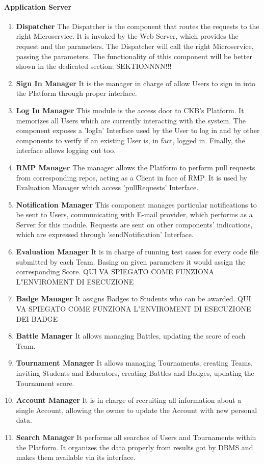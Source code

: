 \paragraph{Application Server}
\begin{enumerate}
    \item \textbf{Dispatcher} The Dispatcher is the component that routes the requests to the right Microservice. It is invoked by the Web Server, which provides the request and the parameters. The Dispatcher will call the right Microservice, passing the parameters. The functionality of tthis component will be better shown in the dedicated section: SEKTIONNNN!!!
    \item \textbf{Sign In Manager} It is the manager in charge of allow Users to sign in into the Platform through proper interface.
    \item \textbf{Log In Manager} This module is the access door to CKB's Platform. It memorizes all Users which are currently interacting with the system. The component exposes a 'logIn' Interface used by the User to log in 
    and by other components to verify if an existing User is, in fact, logged in. Finally, the interface allows logging out too.
    \item \textbf{RMP Manager} The manager allows the Platform to perform pull requests from corresponding repos, acting as a Client in face of RMP. It is used by Evaluation Manager which access 'pullRequests' Interface.
    \item \textbf{Notification Manager} This component manages particular notifications to be sent to Users, communicating with E-mail provider, which performs as a Server for this module. Requests are sent on other 
    components' indications, which are expressed through 'sendNotification' Interface.
    \item \textbf{Evaluation Manager} It is in charge of running test cases for every code file submitted by each Team. Basing on given parameters it would assign the corresponding Score.
    QUI VA SPIEGATO COME FUNZIONA L"ENVIROMENT DI ESECUZIONE
    \item \textbf{Badge Manager} It assigns Badges to Students who can be awarded.
    QUI VA SPIEGATO COME FUNZIONA L"ENVIROMENT DI ESECUZIONE DEI BADGE
    \item \textbf{Battle Manager} It allows managing Battles, updating the score of each Team.
    \item \textbf{Tournament Manager} It allows managing Tournaments, creating Teams, inviting Students and Educators, creating Battles and Badges, updating the Tournament score.
    \item \textbf{Account Manager} It is in charge of recruiting all information about a single Account, allowing the owner to update the Account with new personal data.
    \item \textbf{Search Manager} It performs all searches of Users and Tournaments within the Platform. It organizes the data properly from results got by DBMS and makes them available via its interface.
\end{enumerate}
